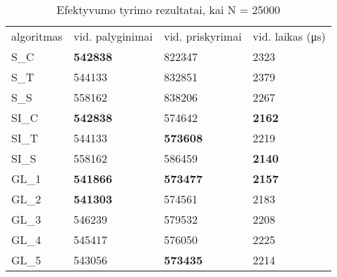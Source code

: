 \documentclass{VUMIFInfKursinis}
\begin{document}
\begin{table}[H]
  \caption{Efektyvumo tyrimo rezultatai, kai N = 25000}
  \label{results_25000}
  \centering
  \begin{tabular}{llll}
    algoritmas & vid. palyginimai                        & vid. priskyrimai                        & vid. laikas (μs)                      \\
    S\_C       & \cellcolor[HTML]{70AD47}\textbf{542838} & 822347                                  & 2323                                  \\
    S\_T       & 544133                                  & 832851                                  & 2379                                  \\
    S\_S       & 558162                                  & 838206                                  & 2267                                  \\
    SI\_C & \cellcolor[HTML]{70AD47}\textbf{542838} & 574642                                  & \cellcolor[HTML]{70AD47}\textbf{2162} \\
    SI\_T      & 544133                                  & \cellcolor[HTML]{70AD47}\textbf{573608} & 2219                                  \\
    SI\_S      & 558162                                  & 586459                                  & \cellcolor[HTML]{70AD47}\textbf{2140} \\
    GL\_1 & \cellcolor[HTML]{70AD47}\textbf{541866} & \cellcolor[HTML]{70AD47}\textbf{573477} & \cellcolor[HTML]{70AD47}\textbf{2157} \\
    GL\_2      & \cellcolor[HTML]{70AD47}\textbf{541303} & 574561                                  & 2183                                  \\
    GL\_3      & 546239                                  & 579532                                  & 2208                                  \\
    GL\_4      & 545417                                  & 576050                                  & 2225                                  \\
    GL\_5      & 543056                                  & \cellcolor[HTML]{70AD47}\textbf{573435} & 2214               
  \end{tabular}
\end{table}
\end{document}
